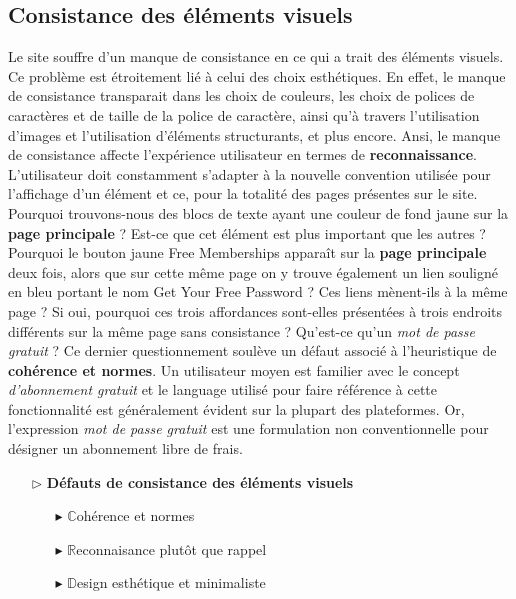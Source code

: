 \documentclass[9pt]{report}
\newcommand{\mathpazott}{\fontfamily{pplj}\selectfont}
\renewcommand{\texttt}[1]{{\scriptsize\mathpazott #1}}
\begin{document}
\begin{multicols*}{2}
  \subsection{Consistance des éléments visuels}
  Le site souffre d'un manque de consistance en ce qui a trait des 
  éléments visuels. Ce problème est étroitement lié à celui des choix 
  esthétiques. En effet, le manque de consistance transparait dans les 
  choix de couleurs, les choix de polices de caractères et de taille 
  de la police de caractère, ainsi qu'à travers 
  l'utilisation d'images et l'utilisation d'éléments structurants, 
  et plus encore. Ansi, 
  le manque de consistance affecte l'expérience utilisateur en termes 
  de \textbf{reconnaissance}. L'utilisateur doit constamment s'adapter à 
  la nouvelle convention utilisée pour l'affichage d'un élément et ce, 
  pour la totalité des pages présentes sur le site. Pourquoi  
  trouvons-nous des blocs de texte ayant une couleur de fond jaune 
  sur la \textbf{page principale} ? Est-ce que cet élément est plus important que 
  les autres ? Pourquoi le bouton jaune \texttt{Free Memberships} apparaît 
  sur la \textbf{page principale} deux fois, alors que sur cette même page 
  on y trouve également 
  un lien souligné en bleu portant le nom \texttt{Get Your Free Password} ?   
  Ces liens mènent-ils à la même page ? Si oui, pourquoi ces 
  trois affordances sont-elles présentées à trois endroits différents 
  sur la même page sans consistance ? Qu'est-ce qu'un 
  \textit{mot de passe gratuit} ? Ce dernier questionnement soulève 
  un défaut associé à l'heuristique de \textbf{cohérence et normes}.
  Un utilisateur moyen est familier avec le concept \textit{d'abonnement gratuit}  
  et le language utilisé pour faire référence à cette fonctionnalité 
  est généralement évident sur la plupart des plateformes. 
  Or, l'expression \textit{mot de passe gratuit} 
  est une formulation non conventionnelle pour désigner un abonnement 
  libre de frais. 

  \begin{itemize}
    \item [$\rhd$ ] \textbf{Défauts de consistance des éléments visuels}  
      \begin{itemize}
        \item [$\blacktriangleright$ ] $\mathbb{C}$ohérence et normes
        \item [$\blacktriangleright$ ] $\mathbb{R}$econnaisance plutôt que rappel 
        \item [$\blacktriangleright$ ] $\mathbb{D}$esign esthétique et minimaliste 
      \end{itemize}
  \end{itemize}
  


\end{multicols*}
\end{document}
